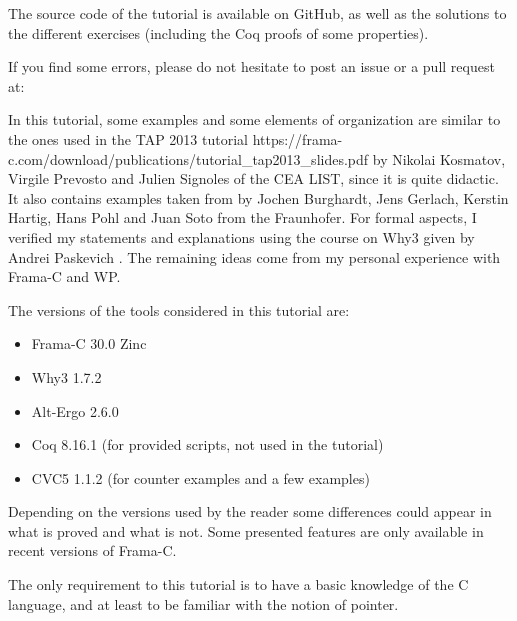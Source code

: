 \begin{Warning}
  The source code of
  the tutorial is available on GitHub, as well as the solutions to the
  different exercises (including the Coq proofs of some properties).

  If you find some errors, please do not hesitate to post an issue or
  a pull request at:

\end{Warning}


\begin{Information}
  In this tutorial, some examples and some elements of organization are
  similar to the ones used in the
  \externalLink
      {TAP 2013 tutorial}
      {https://frama-c.com/download/publications/tutorial_tap2013_slides.pdf}
  by Nikolai Kosmatov, Virgile Prevosto and Julien
  Signoles of the CEA LIST, since it is quite didactic. It also
  contains examples taken from
  \textit{}
  by Jochen Burghardt, Jens Gerlach, Kerstin Hartig, Hans Pohl and Juan
  Soto from the Fraunhofer. For formal aspects, I verified my statements and
  explanations using the course on Why3 given by Andrei Paskevich
  \textit{}.
  The remaining ideas come from my personal experience with Frama-C and WP.

  \horizontalLine

  The versions of the tools considered in this tutorial are:
  \begin{itemize}
  \item Frama-C 30.0 Zinc
  \item Why3 1.7.2
  \item Alt-Ergo 2.6.0
  \item Coq 8.16.1 (for provided scripts, not used in the tutorial)
  \item CVC5 1.1.2 (for counter examples and a few examples)
  \end{itemize}
  Depending on the versions used by the reader some differences could appear in
  what is proved and what is not. Some presented features are only available
  in recent versions of Frama-C.

  \horizontalLine

  The only requirement to this tutorial is to have a basic knowledge of the C
  language, and at least to be familiar with the notion of pointer.
\end{Information}


